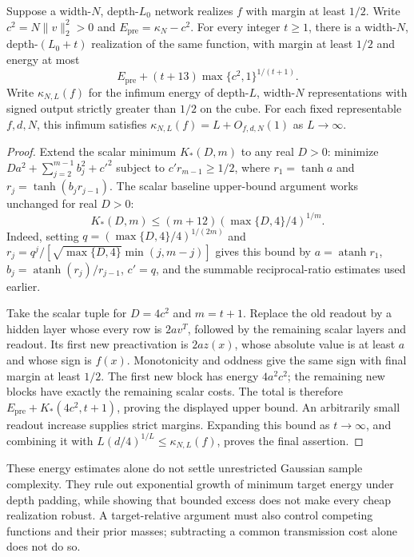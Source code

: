 \begin{proposition}
Suppose a width-$N$, depth-$L_0$ network realizes $f$ with margin at least
$1/2$. Write $c^2=N\|v\|_2^2>0$ and $E_{\mathrm{pre}}=\kappa_N-c^2$.
For every integer $t\ge1$, there is a width-$N$, depth-$(L_0+t)$ realization
of the same function, with margin at least $1/2$ and energy at most
\[
 E_{\mathrm{pre}}+(t+13)\max\{c^2,1\}^{1/(t+1)}.
\]
Write $\kappa_{N,L}(f)$ for the infimum energy of depth-$L$, width-$N$
representations with signed output strictly greater than $1/2$ on the cube.
For each fixed representable $f,d,N$, this infimum satisfies
$\kappa_{N,L}(f)=L+O_{f,d,N}(1)$ as $L\to\infty$.
\end{proposition}

\begin{proof}
Extend the scalar minimum $K_*(D,m)$ to any real $D>0$: minimize
$Da^2+\sum_{j=2}^{m-1}b_j^2+c'^2$ subject to $c'r_{m-1}\ge1/2$,
where $r_1=\tanh a$ and $r_j=\tanh(b_jr_{j-1})$.
The scalar baseline upper-bound argument works unchanged for real $D>0$:
\[
 K_*(D,m)\le(m+12)(\max\{D,4\}/4)^{1/m}.
\]
Indeed, setting $q=(\max\{D,4\}/4)^{1/(2m)}$ and
$r_j=q^j/[\sqrt{\max\{D,4\}}\min(j,m-j)]$ gives this bound by
$a=\operatorname{atanh}r_1$, $b_j=\operatorname{atanh}(r_j)/r_{j-1}$,
$c'=q$, and the summable reciprocal-ratio estimates used earlier.

Take the scalar tuple for $D=4c^2$ and $m=t+1$. Replace the old readout
by a hidden layer whose every row is $2a v^T$, followed by the remaining
scalar layers and readout. Its first new preactivation is $2az(x)$, whose
absolute value is at least $a$ and whose sign is $f(x)$. Monotonicity and
oddness give the same sign with final margin at least $1/2$.
The first new block has energy $4a^2c^2$; the remaining new blocks have
exactly the remaining scalar costs. The total is therefore
$E_{\mathrm{pre}}+K_*(4c^2,t+1)$, proving the displayed upper bound.
An arbitrarily small readout increase supplies strict margins.
Expanding this bound as $t\to\infty$, and combining it with
$L(d/4)^{1/L}\le\kappa_{N,L}(f)$, proves the final assertion.
\end{proof}

These energy estimates alone do not settle unrestricted Gaussian sample
complexity. They rule out exponential growth of minimum target energy under depth
padding, while showing that bounded excess does not make every cheap
realization robust. A target-relative argument must also control competing
functions and their prior masses; subtracting a common transmission cost
alone does not do so.
